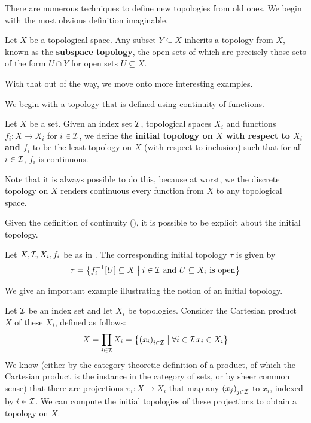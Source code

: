 There are numerous techniques to define new topologies from old ones. We begin with the most obvious definition imaginable.

\begin{boxdefinition}
    Let $X$ be a topological space. Any subset $Y \subseteq X$ inherits a topology from $X$, known as the \textbf{subspace topology}, the open sets of which are precisely those sets of the form $U \cap Y$ for open sets $U \subseteq X$.
\end{boxdefinition}

With that out of the way, we move onto more interesting examples.

We begin with a topology that is defined using continuity of functions.

\begin{boxdefinition}\label{Ch1:Def:Init_Top}
    Let $X$ be a set. Given an index set $\mathcal{I}$, topological spaces $X_i$ and functions $f_i : X \to X_i$ for $i \in \mathcal{I}$, we define the \textbf{initial topology on $X$ with respect to $X_i$ and $f_i$} to be the least topology on $X$ (with respect to inclusion) such that for all $i \in \mathcal{I}$, $f_i$ is continuous.
\end{boxdefinition}

Note that it is always possible to do this, because at worst, we the discrete topology on $X$ renders continuous every function from $X$ to any topological space.

Given the definition of continuity (), it is possible to be explicit about the initial topology.

\begin{boxlemma}
    Let $X, \mathcal{I}, X_i, f_i$ be as in . The corresponding initial topology $\tau$ is given by
    \begin{align*}
        \tau = \left\{ f_i^{-1}\!\left[ U \right] \subseteq X \; \middle\vert \; i \in \mathcal{I} \text{ and } U \subseteq X_i \text{ is open} \right\}
    \end{align*}
\end{boxlemma}

We give an important example illustrating the notion of an initial topology.

\begin{boxexample}[Products]\label{Ch1:Eg:Prod_Top_as_Init_Top}
    Let $\mathcal{I}$ be an index set and let $X_i$ be topologies. Consider the Cartesian product $X$ of these $X_i$, defined as follows:
    \begin{align*}
        X = \prod_{i \in \mathcal{I}} X_i = \left\{ \left( x_i \right)_{i \in \mathcal{I}} \; \middle\vert \; \forall i \in \mathcal{I}\, x_i \in X_i \right\}
    \end{align*}
    We know (either by the category theoretic definition of a product, of which the Cartesian product is the instance in the category of sets, or by sheer common sense) that there are projections $\pi_i : X \to X_i$ that map any $\left( x_j \right)_{j \in \mathcal{I}}$ to $x_i$, indexed by $i \in \mathcal{I}$. We can compute the initial topologies of these projections to obtain a topology on $X$.
\end{boxexample}

